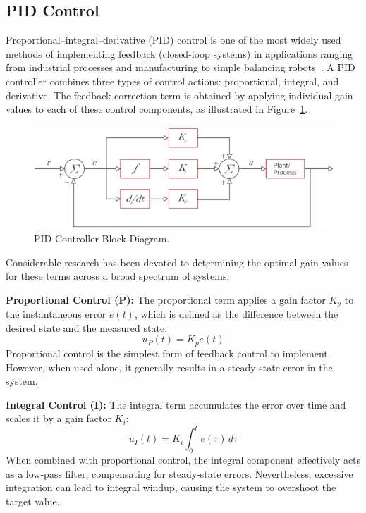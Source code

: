 \documentclass[english, bachelor, utf8]{base/thesis_telematics}
\begin{document}
\subsection{PID Control}
Proportional–integral–derivative (PID) control is one of the most widely used methods of implementing feedback (closed-loop systems) in applications ranging from industrial processes and manufacturing to simple balancing robots~\cite{feedbackBook}. 
A PID controller combines three types of control actions: proportional, integral, and derivative. The feedback correction term is obtained by applying individual gain values to each of these control components, as illustrated in Figure~\ref{fig:pid_control}.
\begin{figure}[ht]
\centering
\includegraphics[width=0.7\columnwidth]{pics/pid_control.png}
\caption{PID Controller Block Diagram.~\cite{vectornav_math_controls}}
\label{fig:pid_control}
\end{figure}

Considerable research has been devoted to determining the optimal gain values for these terms across a broad spectrum of systems.

\textbf{Proportional Control (P):}  
The proportional term applies a gain factor $K_p$ to the instantaneous error $e(t)$, which is defined as the difference between the desired state and the measured state:
\begin{equation}
    u_P(t) = K_p e(t)
    \label{eq:P}
\end{equation}
Proportional control is the simplest form of feedback control to implement. However, when used alone, it generally results in a steady-state error in the system.

\textbf{Integral Control (I):}  
The integral term accumulates the error over time and scales it by a gain factor $K_i$:
\begin{equation}
    u_I(t) = K_i \int_{0}^{t} e(\tau) \, d\tau
    \label{eq:I}
\end{equation}
When combined with proportional control, the integral component effectively acts as a low-pass filter, compensating for steady-state errors. Nevertheless, excessive integration can lead to integral windup, causing the system to overshoot the target value.
\end{document}
